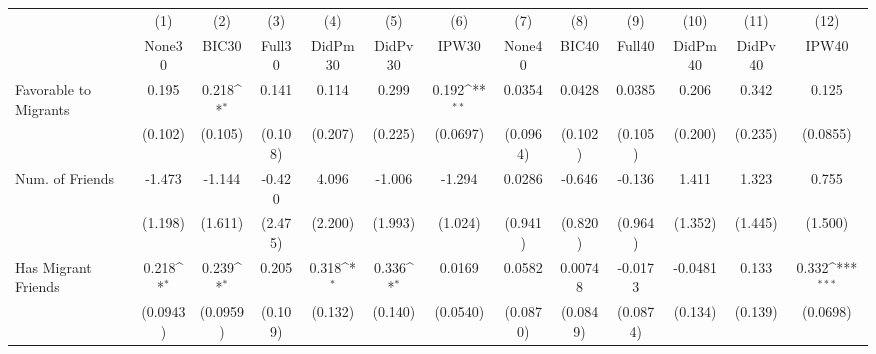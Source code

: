 {
\def\sym#1{\ifmmode^{#1}\else\(^{#1}\)\fi}
\begin{tabular}{l*{12}{c}}
\toprule
            &\multicolumn{1}{c}{(1)}&\multicolumn{1}{c}{(2)}&\multicolumn{1}{c}{(3)}&\multicolumn{1}{c}{(4)}&\multicolumn{1}{c}{(5)}&\multicolumn{1}{c}{(6)}&\multicolumn{1}{c}{(7)}&\multicolumn{1}{c}{(8)}&\multicolumn{1}{c}{(9)}&\multicolumn{1}{c}{(10)}&\multicolumn{1}{c}{(11)}&\multicolumn{1}{c}{(12)}\\
            &\multicolumn{1}{c}{None30}&\multicolumn{1}{c}{BIC30}&\multicolumn{1}{c}{Full30}&\multicolumn{1}{c}{DidPm30}&\multicolumn{1}{c}{DidPv30}&\multicolumn{1}{c}{IPW30}&\multicolumn{1}{c}{None40}&\multicolumn{1}{c}{BIC40}&\multicolumn{1}{c}{Full40}&\multicolumn{1}{c}{DidPm40}&\multicolumn{1}{c}{DidPv40}&\multicolumn{1}{c}{IPW40}\\
\midrule
Favorable to Migrants&       0.195         &       0.218\sym{*}  &       0.141         &       0.114         &       0.299         &       0.192\sym{**} &      0.0354         &      0.0428         &      0.0385         &       0.206         &       0.342         &       0.125         \\
            &     (0.102)         &     (0.105)         &     (0.108)         &     (0.207)         &     (0.225)         &    (0.0697)         &    (0.0964)         &     (0.102)         &     (0.105)         &     (0.200)         &     (0.235)         &    (0.0855)         \\
\addlinespace
Num. of Friends&      -1.473         &      -1.144         &      -0.420         &       4.096         &      -1.006         &      -1.294         &      0.0286         &      -0.646         &      -0.136         &       1.411         &       1.323         &       0.755         \\
            &     (1.198)         &     (1.611)         &     (2.475)         &     (2.200)         &     (1.993)         &     (1.024)         &     (0.941)         &     (0.820)         &     (0.964)         &     (1.352)         &     (1.445)         &     (1.500)         \\
\addlinespace
Has Migrant Friends&       0.218\sym{*}  &       0.239\sym{*}  &       0.205         &       0.318\sym{*}  &       0.336\sym{*}  &      0.0169         &      0.0582         &     0.00748         &     -0.0173         &     -0.0481         &       0.133         &       0.332\sym{***}\\
            &    (0.0943)         &    (0.0959)         &     (0.109)         &     (0.132)         &     (0.140)         &    (0.0540)         &    (0.0870)         &    (0.0849)         &    (0.0874)         &     (0.134)         &     (0.139)         &    (0.0698)         \\

\end{tabular}}
